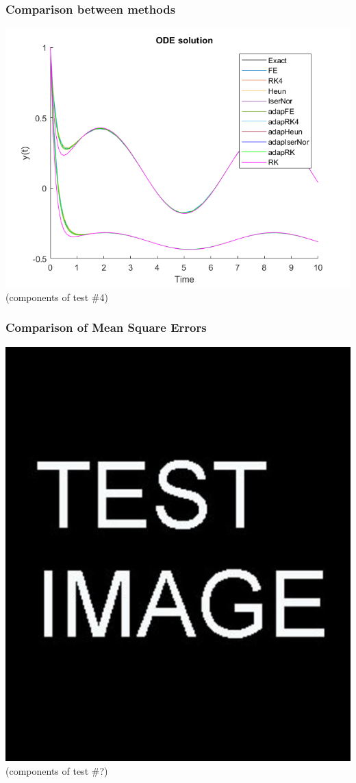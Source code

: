 \documentclass{beamer}
\begin{document}
\begin{frame} %
	\frametitle{Comparison between methods}
	\begin{center}
		\includegraphics[width=0.8\linewidth]{etc/results_test_4.png} \\
		(components of test \#4)
	\end{center}
\end{frame}


\begin{frame} %
\frametitle{Comparison of Mean Square Errors}
\begin{center}
	\includegraphics[width=0.8\linewidth]{etc/test.jpg} \\
	(components of test \#?) %
\end{center}
\end{frame}
\end{document}
